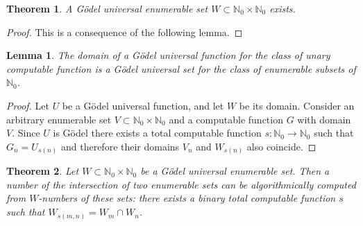 \documentclass[10pt, letterpaper]{article}
\newcommand{\N}{\mathbb{N}}
\newtheorem{thm}{Theorem}
\newtheorem{lemma}{Lemma}
\theoremstyle{remark}
\theoremstyle{definition}
\begin{document}
\begin{thm}
    A G\"{o}del universal enumerable set $W \subset \N_0 \times \N_0$ exists.
\end{thm}

\begin{proof}
    This is a consequence of the following lemma.
\end{proof}

\begin{lemma}
    The domain of a G\"{o}del universal function for the class of unary computable function is a G\"{o}del universal set 
    for the class of enumerable subsets of $\N_0$.
\end{lemma}

\begin{proof}
    Let $U$ be a G\"{o}del universal function, and let $W$ be its domain. Consider an arbitrary enumerable set $V \subset \N_0 \times \N_0$ 
    and a computable function $G$ with domain $V$. Since $U$ is G\"{o}del there exists a total computable function 
    $s:\N_0 \rightarrow \N_0$ such that $G_n = U_{s(n)}$ and therefore their domains $V_n$ and $W_{s(n)}$ also coincide.
\end{proof}

\begin{thm}
    Let $W \subset \N_0 \times \N_0$ be a G\"{o}del universal enumerable set. Then a number of the intersection of two enumerable 
    sets can be algorithmically computed from $W$-numbers of these sets: there exists a binary total computable function $s$ such that 
    $W_{s(m,n)} = W_m \cap W_n$.
\end{thm}
\end{document}
